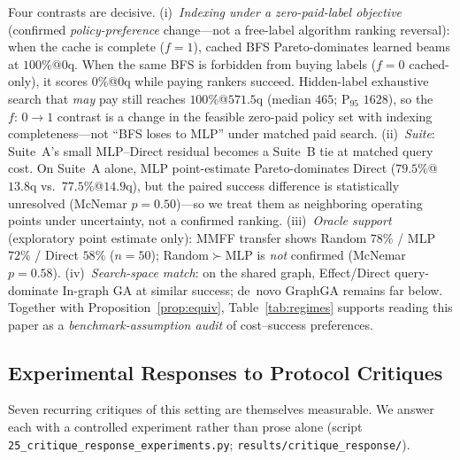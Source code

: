 \documentclass[journal=jcisd8,manuscript=article,email=false]{achemso}
\begin{document}
Four contrasts are decisive. (i)~\emph{Indexing under a zero-paid-label objective} (confirmed \emph{policy-preference} change---not a free-label algorithm ranking reversal): when the cache is complete ($f{=}1$), cached BFS Pareto-dominates learned beams at $100\%$@$0$q. When the same BFS is forbidden from buying labels ($f{=}0$ cached-only), it scores $0\%$@$0$q while paying rankers succeed. Hidden-label exhaustive search that \emph{may} pay still reaches $100\%$@$571.5$q (median $465$; P$_{95}$ $1628$), so the $f{:}\,0\!\to\!1$ contrast is a change in the feasible zero-paid policy set with indexing completeness---not ``BFS loses to MLP'' under matched paid search. (ii)~\emph{Suite}: Suite~A's small MLP--Direct residual becomes a Suite~B tie at matched query cost. On Suite~A alone, MLP point-estimate Pareto-dominates Direct ($79.5\%$@$13.8$q vs.\ $77.5\%$@$14.9$q), but the paired success difference is statistically unresolved (McNemar $p{=}0.50$)---so we treat them as neighboring operating points under uncertainty, not a confirmed ranking. (iii)~\emph{Oracle support} (exploratory point estimate only): MMFF transfer shows Random $78\%$ / MLP $72\%$ / Direct $58\%$ ($n{=}50$); Random$\succ$MLP is \emph{not} confirmed (McNemar $p{=}0.58$). (iv)~\emph{Search-space match}: on the shared graph, Effect/Direct query-dominate In-graph GA at similar success; de~novo GraphGA remains far below. Together with Proposition~\ref{prop:equiv}, Table~\ref{tab:regimes} supports reading this paper as a \emph{benchmark-assumption audit} of cost--success preferences.

\subsection{Experimental Responses to Protocol Critiques}
\label{sec:critique_response}

Seven recurring critiques of this setting are themselves measurable. We answer each with a controlled experiment rather than prose alone (script \texttt{25\_critique\_response\_experiments.py}; \texttt{results/critique\_response/}).
\end{document}
